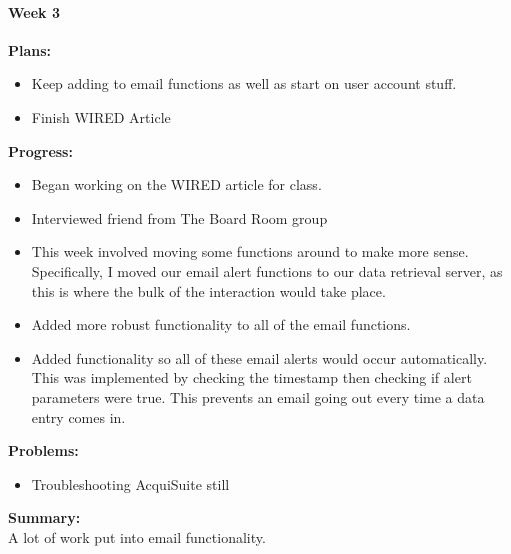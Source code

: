 \paragraph{Week 3}
\begin{adjustwidth}{2.5em}{0pt}
    \vspace{-0.5cm}\textbf{Plans:}
    \vspace{-0.5cm}
    \begin{itemize}
        \item Keep adding to email functions as well as start on user account stuff.
        \item Finish WIRED Article
    \end{itemize} 
    \vspace{-0.3cm}\textbf{Progress:}
    \vspace{-0.5cm}
    \begin{itemize}
        \item Began working on the WIRED article for class.
        \item Interviewed friend from The Board Room group
        \item This week involved moving some functions around to make more sense. Specifically, I moved our email alert functions to our data retrieval server, as this is where the bulk of the interaction would take place. 
		\item Added more robust functionality to all of the email functions. 
		\item Added functionality so all of these email alerts would occur automatically. This was implemented by checking the timestamp then checking if alert parameters were true. This prevents an email going out every time a data entry comes in.
    
    \end{itemize} 
    \vspace{-0.3cm}\textbf{Problems:}
    \vspace{-0.5cm}
    \begin{itemize}
        \item Troubleshooting AcquiSuite still
    \end{itemize}  
    \vspace{-0.3cm}\noindent\textbf{Summary:}\\
    \noindent A lot of work put into email functionality. 
\end{adjustwidth} 
